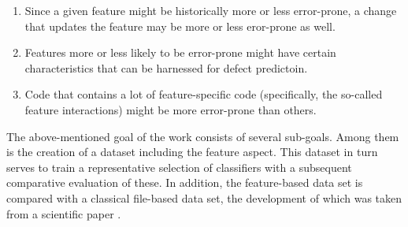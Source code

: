 \begin{enumerate}
\setlength{\itemsep}{-2pt}
\item Since a given feature  might be historically more or less error-prone, a change that updates  the feature may be more or less eror-prone as well.
\item Features more or  less likely to be error-prone might have certain characteristics that can be harnessed for defect predictoin.
\item Code that contains a lot of feature-specific code (specifically, the so-called feature interactions) might be more error-prone than others. 
\end{enumerate}

The above-mentioned goal of the work consists of several sub-goals. Among them is the creation of a dataset including the feature aspect. This dataset in turn serves to train a representative selection of classifiers with a subsequent comparative evaluation of these. In addition, the feature-based data set is compared with a classical file-based data set, the development of which was taken from a scientific paper \cite{Moser2008}.
